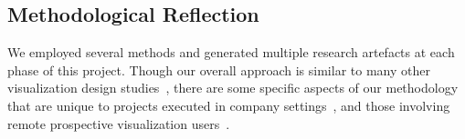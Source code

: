 \documentclass[journal]{vgtc}                %
\newcommand*\rot{\scriptsize \rotatebox{90}}
\newcommand*\OK{\ding{51}}
\begin{document}

\subsection{Methodological Reflection}
\label{discussion-methodology}


We employed several methods and generated multiple research artefacts at each phase of this project.
Though our overall approach is similar to many other visualization design studies~\cite{McKenna2014,Sedlmair2012}, there are some specific aspects of our methodology that are unique to projects executed in company settings~\cite{Sedlmair2011}, and those involving remote prospective visualization users~\cite{Brehmer2014a}.

    
    
        

    
        
        
        
        
        
        
        
        
\end{document}
